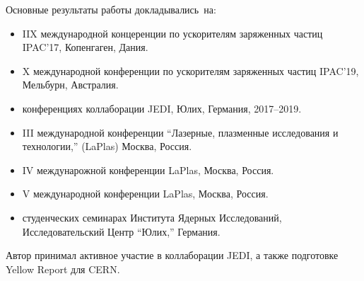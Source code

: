 {\probation}
Основные результаты работы докладывались~на:
\begin{itemize}
\item IIX международной концеренции по ускорителям заряженных частиц IPAC'17, Копенгаген, Дания.
\item X международной конференции по ускорителям заряженных частиц IPAC'19, Мельбурн, Австралия.
\item конференциях коллаборации JEDI, Юлих, Германия, 2017--2019.
\item III международной конференции ``Лазерные, плазменные исследования и технологии,'' (LaPlas) Москва, Россия. 
\item IV междунарожной конференции LaPlas, Москва, Россия.
\item V международной конференции LaPlas, Москва, Россия.
\item студенческих семинарах Института Ядерных Исследований, Исследовательский Центр ``Юлих,'' Германия.
\end{itemize}

{\contribution} Автор принимал активное участие в коллаборации JEDI, а также подготовке Yellow Report для CERN.


